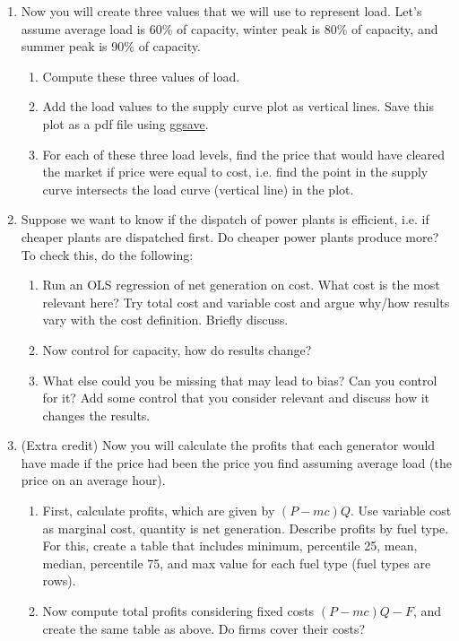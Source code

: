 \documentclass[11pt]{article}
\begin{document}
\begin{enumerate}
\item  Now you will create three values that we will use to represent load. Let's assume average load is 60\% of capacity, winter peak is 80\% of capacity, and summer peak is 90\% of capacity.
	\begin{enumerate}
	\item  Compute these three values of load.
	\item Add the load values to the supply curve plot as vertical lines. Save this plot as a pdf file using \href{https://ggplot2.tidyverse.org/reference/ggsave.html}{ggsave}.
	\item For each of these three load levels, find the price that would have cleared the market if price were equal to cost, i.e. find the point in the supply curve intersects the load curve (vertical line) in the plot.
	\end{enumerate}
	
\item Suppose we want to know if the dispatch of power plants is efficient, i.e. if cheaper plants are dispatched first. Do cheaper power plants produce more? To check this, do the following:
		\begin{enumerate}
		\item Run an OLS regression of net generation on cost. What cost is the most relevant here? Try total cost and variable cost and argue why/how results vary with the cost definition. Briefly discuss.
		\item Now control for capacity, how do results change?
		\item What else could you be missing that may lead to bias? Can you control for it?	Add some control that you consider relevant and discuss how it changes the results. 
		\end{enumerate}

	

\item (Extra credit)  Now you will calculate the profits that each generator would have made if the price had been the price you find assuming average load (the price on an average hour). 
	\begin{enumerate}
	\item First, calculate profits, which are given by $(P-mc)Q$. Use variable cost as marginal cost, quantity is net generation. Describe profits by fuel type. For this, create a table that includes minimum, percentile 25, mean, median, percentile 75, and max value for each fuel type (fuel types are rows).
	\item Now compute total profits considering fixed costs $(P-mc)Q -F$, and create the same table as above. Do firms cover their costs?
	\end{enumerate}
	

\end{enumerate}
\end{document}
